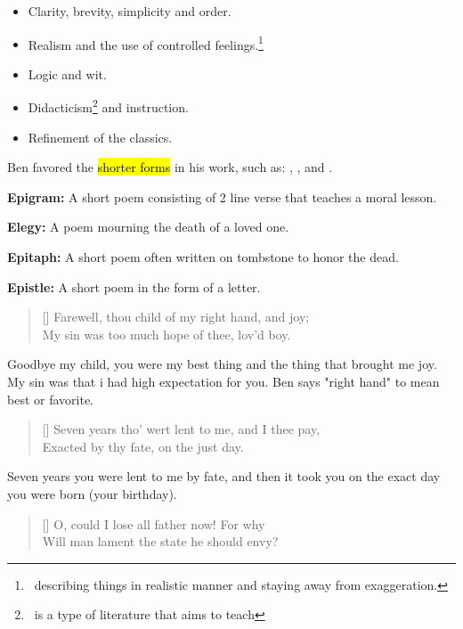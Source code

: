 
\begin{itemize}
  \item Clarity, brevity, simplicity and order.
  \item Realism and the use of controlled feelings.\footnote{\, describing things in realistic  manner and staying away 
    from exaggeration.}
  \item Logic and wit.
  \item Didacticism\footnote{\, is a type of literature that aims to teach}
    and instruction.
  \item Refinement of the classics. 
\end{itemize}


Ben favored the \hl{shorter forms} in his work, such as: 
, ,  and 
.\medbreak


\textbf{Epigram:} A short poem consisting of 2 line verse that teaches a moral lesson.\medbreak

\textbf{Elegy:} A poem mourning the death of a loved one.\medbreak

\textbf{Epitaph:} A short poem often written on tombstone
to honor the dead.\medbreak

\textbf{Epistle:} A short poem in the form of a letter.

\settowidth{\versewidth}{Farewell, thou child of my right hand, and joy}
\begin{verse}[\versewidth]
{\fontverse
Farewell, thou child of my right hand, and joy;\\
My sin was too much hope of thee, lov'd boy. 
}
\end{verse}

Goodbye my child, you were my best thing and the thing that brought me joy.
My sin was that i had high expectation for you. Ben says "right 
hand" to mean best or favorite.

\begin{verse}[\versewidth]
{\fontverse
Seven years tho' wert lent to me, and I thee pay, \\
Exacted by thy fate, on the just day. 
}
\end{verse}

Seven years you were lent to me by fate, and then it took you on the 
exact day you were born (your birthday).

\begin{verse}[\versewidth]
{\fontverse
O, could I lose all father now! For why \\
Will man lament the state he should envy? 
}
\end{verse}

